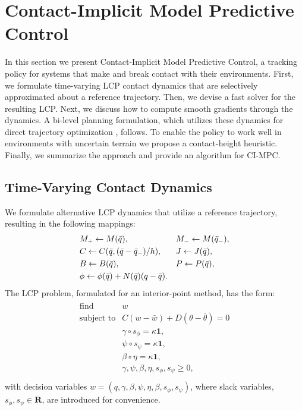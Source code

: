 \section{Contact-Implicit Model Predictive Control} \label{cimpc}
In this section we present Contact-Implicit Model Predictive Control, a tracking policy for systems that make and break contact with their environments. First, we formulate time-varying LCP contact dynamics that are selectively approximated about a reference trajectory. Then, we devise a fast solver for the resulting LCP. Next, we discuss how to compute smooth gradients through the dynamics. A bi-level planning formulation, which utilizes these dynamics for direct trajectory optimization \cite{von1992direct}, follows. To enable the policy to work well in environments with uncertain terrain we propose a contact-height heuristic. Finally, we summarize the approach and provide an algorithm for CI-MPC.

\subsection{Time-Varying Contact Dynamics}
We formulate alternative LCP dynamics that utilize a reference trajectory, resulting in the following mappings: 
\begin{align}
	&M_{+} \leftarrow M(\bar{q}), 
	&&M_{-} \leftarrow M(\bar{q}_{-}), \notag \\ 
	&C \leftarrow C(\bar{q}, (\bar{q} - \bar{q}_{-}) / h), 
	&&J \leftarrow J(\bar{q}),  \\ 
	&B \leftarrow B(\bar{q}), 
	&& P \leftarrow P(\bar{q}), \notag \\
	& \phi \leftarrow \phi(\bar{q}) + N(\bar{q}) (q - \bar{q}). \notag
\end{align}
The LCP problem, formulated for an interior-point method, has the form:
\begin{align}
	\begin{array}{ll}
		{\mbox{find}} & w \\
		\mbox{subject to} 
		& C (w - \bar{w}) + D (\theta - \bar{\theta}) = 0 \\
		& \gamma \circ s_{\phi}  = \kappa \textbf{1}, \\
		& \psi \circ s_{\psi} = \kappa \textbf{1}, \\
		& \beta \circ \eta = \kappa \textbf{1}, \\
		& \gamma, \psi, \beta, \eta, s_{\phi}, s_{\psi} \geq 0, \\
	\end{array} \label{cipc_linearized_feas_prob}
\end{align}
with decision variables $w = (q, \gamma, \beta, \psi, \eta, \beta, s_{\phi}, s_{\psi})$, where slack variables, $s_{\phi}, s_{\psi} \in \mathbf{R}$, are introduced for convenience.

